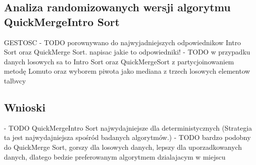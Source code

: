 \begin{figure}[]
	\centering
	
	\caption[]{}
	\label{fig:quick-merge-intro-sort-deterministic-pivot-density}
\end{figure}

\begin{figure}[]
	\centering
	
	\caption[]{}
	\label{fig:quick-merge-intro-sort-deterministic-pivot-density-sorted}
\end{figure}

\subsection{Analiza randomizowanych wersji algorytmu QuickMergeIntro Sort}

GESTOSC
- TODO porownywano do najwyjadniejszych odpowiednikow Intro Sort oraz QuickMerge Sort. napisac jakie to odpowiedniki!
- TODO w przypadku danych losowych sa to Intro Sort oraz QuickMergeSort z partycjoinowaniem metodę Lomuto oraz wyborem piwota jako mediana z trzech losowych elementow talbvcy 

\begin{figure}[]
	\centering
	
	\caption[]{}
	\label{fig:quick-merge-intro-sort-nondeterministic-pivot-random-sorted}
\end{figure}

\begin{figure}[]
	\centering
	
	\caption[]{}
	\label{fig:quick-merge-intro-sort-nondeterministic-pivot-density}
\end{figure}

\begin{figure}[]
	\centering
	
	\caption[]{}
	\label{fig:quick-merge-intro-sort-nondeterministic-pivot-density-sorted}
\end{figure}

\subsection{Wnioski}
- TODO QuickMergeIntro Sort najwydajniejsze dla deterministycznych (Strategia ta jest najwydajniejsza spośród badanych algorytmów.)
- TODO bardzo podobny do QuickMerge Sort, gorszy dla losowych danych, lepszy dla uporzadkowanych danych, dlatego bedzie preferowanym algorytmem dzialajacym w miejscu